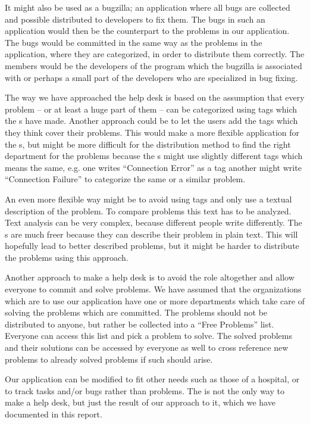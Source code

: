 It might also be used as a bugzilla; an application where all bugs are collected and possible distributed to developers to fix them.
The bugs in such an application would then be the counterpart to the problems in our application.
The bugs would be committed in the same way as the problems in the \hdesk[] application, where they are categorized, in order to distribute them correctly.
The \astaff[] members would be the developers of the program which the bugzilla is associated with or perhaps a small part of the developers who are specialized in bug fixing.

The way we have approached the help desk is based on the assumption that every problem -- or at least a huge part of them -- can be categorized using tags which the \admin[]s have made.
Another approach could be to let the users add the tags which they think cover their problems.
This would make a more flexible application for the \aclient[]s, but might be more difficult for the distribution method to find the right department for the problems because the \aclient[]s might use slightly different tags which means the same, e.g. one \aclient[] writes ``Connection Error'' as a tag another might write ``Connection Failure'' to categorize the same or a similar problem.

An even more flexible way might be to avoid using tags and only use a textual description of the problem.
To compare problems this text has to be analyzed.
Text analysis can be very complex, because different people write differently.
The \aclient[]s are much freer because they can describe their problem in plain text.
This will hopefully lead to better described problems, but it might be harder to distribute the problems using this approach.

Another approach to make a help desk is to avoid the \astaff[] role altogether and allow everyone to commit and solve problems.
We have assumed that the organizations which are to use our application have one or more departments which take care of solving the problems which are committed. The problems should not be distributed to anyone, but rather be collected into a ``Free Problems'' list.
Everyone can access this list and pick a problem to solve.
The solved problems and their solutions can be accessed by everyone as well to cross reference new problems to already solved problems if such should arise.


Our application can be modified to fit other needs such as those of a hospital, or to track tasks and/or bugs rather than problems.
The \hdesk[] is not the only way to make a help desk, but just the result of our approach to it, which we have documented in this report.



